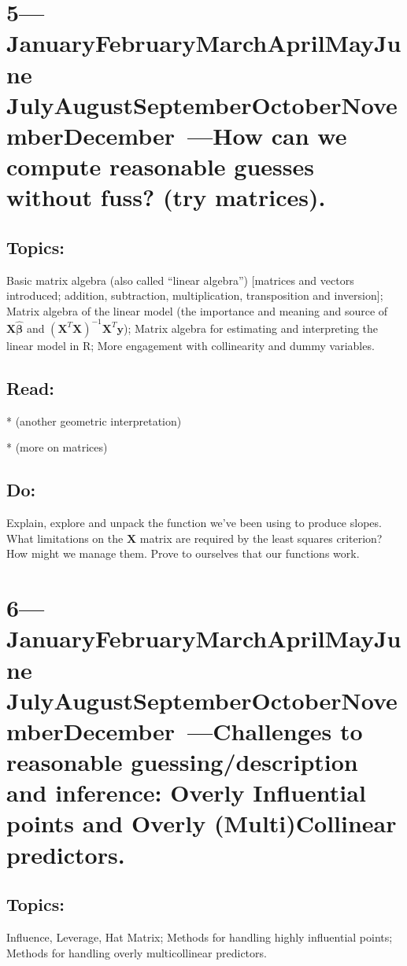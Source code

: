 \documentclass[10pt]{article}
\def\themonth{\ifcase\month\or
  January\or February\or March\or April\or May\or June\or
  July\or August\or September\or October\or November\or December\fi}
\newcommand{\bX}{\mathbf{X}}
\newcommand{\by}{\mathbf{y}}
\newcommand{\bbeta}{\boldsymbol{\beta}}
\begin{document}
\AdvanceDate[7]
\section{5---\themonth~\the\day---How can we compute reasonable guesses without
  fuss? (try matrices).}


\subsection{Topics:} Basic matrix algebra (also called ``linear
algebra'') [matrices and vectors introduced; addition, subtraction,
multiplication, transposition and inversion]; Matrix algebra of the
linear model (the importance and meaning and source of $\bX \hat{\bbeta}$ and
$(\bX^{T}\bX)^{-1} \bX^{T}\by$); Matrix algebra for estimating and
interpreting the linear model in R; More engagement with collinearity
and dummy variables.

\subsection{Read:}
\citealp[Appendix B.1.0--B.1.3 and Chap 9]{fox2008applied} 

*\citealp[Chap 10]{fox2008applied} (another geometric interpretation)

*\citealp[Appendix B]{fox2008applied} (more on matrices)

\subsection{Do:} Explain, explore and unpack the function we've been
using to produce slopes. What limitations on the $\bX$ matrix are
required by the least squares criterion? How might we manage
them. Prove to ourselves that our functions work.

\AdvanceDate[7]
\section{6---\themonth~\the\day---Challenges to reasonable guessing/description
  and inference: Overly Influential points and Overly (Multi)Collinear
  predictors.}

\subsection{Topics:} Influence, Leverage, Hat Matrix; Methods for
handling highly influential points; Methods for handling overly
multicollinear predictors.
\end{document}
